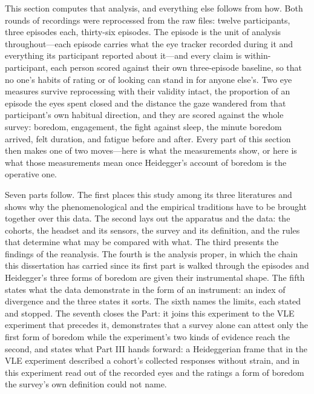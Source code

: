 This section computes that analysis, and everything else follows from how. Both rounds of
recordings were reprocessed from the raw files: twelve participants, three episodes each,
thirty-six episodes. The episode is the unit of analysis throughout---each episode carries
what the eye tracker recorded during it and everything its participant reported about
it---and every claim is within-participant, each person scored against their own
three-episode baseline, so that no one's habits of rating or of looking can stand in for
anyone else's. Two eye measures survive reprocessing with their validity intact, the
proportion of an episode the eyes spent closed and the distance the gaze wandered from that
participant's own habitual direction, and they are scored against the whole survey: boredom,
engagement, the fight against sleep, the minute boredom arrived, felt duration, and fatigue
before and after. Every part of this section then makes one of two moves---here is what the
measurements show, or here is what those measurements mean once Heidegger's account of
boredom is the operative one.

Seven parts follow. The first places this study among its three literatures and shows why
the phenomenological and the empirical traditions have to be brought together over this
data. The second lays out the apparatus and the data: the cohorts, the headset and its
sensors, the survey and its definition, and the rules that determine what may be compared
with what. The third presents the findings of the reanalysis. The fourth is the analysis
proper, in which the chain this dissertation has carried since its first part is walked
through the episodes and Heidegger's three forms of boredom are given their instrumental
shape. The fifth states what the data demonstrate in the form of an instrument: an index of
divergence and the three states it sorts. The sixth names the limits, each stated and
stopped. The seventh closes the Part: it joins this experiment to the VLE experiment that
precedes it, demonstrates that a survey alone can attest only the first form of boredom
while the experiment's two kinds of evidence reach the second, and states what Part III
hands forward: a Heideggerian frame that in the VLE experiment described a cohort's
collected responses without strain, and in this experiment read out of the recorded eyes and
the ratings a form of boredom the survey's own definition could not name.

